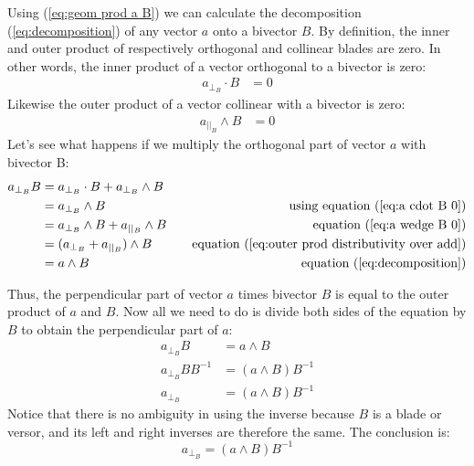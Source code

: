 \documentclass[10pt]{report}
\begin{document}
Using (\ref{eq:geom prod a B}) we can calculate the decomposition
(\ref{eq:decomposition}) of any vector $a$ onto a bivector $B$. By
definition, the inner and outer product of respectively orthogonal
and collinear blades are zero. In other words, the inner product
of a vector orthogonal to a bivector is zero:
\begin{align}
        a_{\bot_{B}} \cdot B &= 0  \label{eq:a cdot B 0}
\end{align}
Likewise the outer product of a vector collinear with a bivector
is zero:
\begin{align}
        a_{||_{B}} \wedge B &= 0  \label{eq:a wedge B 0}
\end{align}
Let's see what happens if we multiply the orthogonal part of
vector $a$ with bivector B:
\begin{align}
        a_{\bot_{B}}B &= a_{\bot_{B}}\cdot B + a_{\bot_{B}}\wedge B &&&\text{} \nonumber \\
                      &= a_{\bot_{B}}\wedge B &&&\text{using equation (\ref{eq:a cdot B 0})} \nonumber \\
                      &= a_{\bot_{B}}\wedge B + a_{||_{B}}\wedge B &&&\text{equation (\ref{eq:a wedge B 0})} \nonumber \\
                      &= (a_{\bot_{B}} + a_{||_{B}})\wedge B &&&\text{equation (\ref{eq:outer prod distributivity over add})} \nonumber \\
                      &= a\wedge B &&&\text{equation (\ref{eq:decomposition})} \nonumber
\end{align}

Thus, the perpendicular part of vector $a$ times bivector $B$ is
equal to the outer product of $a$ and $B$. Now all we need to do
is divide both sides of the equation by $B$ to obtain the
perpendicular part of $a$:
\begin{align}
        a_{\bot_{B}}B       &= a\wedge B           \nonumber \\
        a_{\bot_{B}}BB^{-1} &= (a\wedge B)B^{-1}   \nonumber \\
        a_{\bot_{B}}        &= (a\wedge B)B^{-1}   \nonumber
\end{align}
Notice that there is no ambiguity in using the inverse because $B$
is a blade or versor, and its left and right inverses are
therefore the same. The conclusion is:
\begin{equation}
    a_{\bot_{B}} = (a\wedge B)B^{-1}   \label{eq:perpendicular calculation}
\end{equation}
\end{document}
